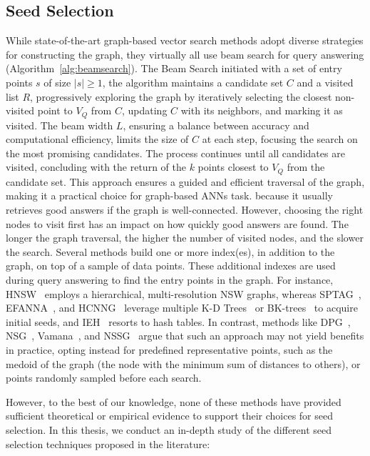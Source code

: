 \subsection{Seed Selection}
\label{sec:ss}
While state-of-the-art graph-based vector search methods adopt diverse strategies for constructing the graph, they virtually all use beam search for query answering (Algorithm~\ref{alg:beamsearch}).
The Beam Search initiated with a set of entry points \( s \) of size $ |s| \geq 1$, the algorithm maintains a candidate set \( C \) and a visited list \( R \), progressively exploring the graph by iteratively selecting the closest non-visited point to \( V_Q \) from \( C \), updating \( C \) with its neighbors, and marking it as visited. The beam width \( L \), ensuring a balance between accuracy and computational efficiency, limits the size of \( C \) at each step, focusing the search on the most promising candidates. The process continues until all candidates are visited, concluding with the return of the \( k \) points closest to \( V_Q \) from the candidate set. This approach ensures a guided and efficient traversal of the graph, making it a practical choice for graph-based ANNs task.
because it usually retrieves good answers if the graph is well-connected. However, choosing the right nodes to visit first has an impact on how quickly good answers are found. The longer the graph traversal, the higher the number of visited nodes, and the slower the search.
Several methods build one or more index(es), in addition to the graph, on top of a sample of data points. These additional indexes are used during query answering to find the entry points in the graph.
For instance, HNSW~\cite{hnsw} employs a hierarchical, multi-resolution NSW graphs, whereas SPTAG~\cite{SPTAG4}, EFANNA~\cite{efanna}, and HCNNG~\cite{hcnng} leverage multiple K-D Trees~\cite{kdtree} or BK-trees~\cite{bkmtree} to acquire initial seeds, and IEH~\cite{ieh} resorts to hash tables. In contrast, methods like DPG~\cite{dpg}, NSG~\cite{nsg}, Vamana~\cite{vamana}, and NSSG~\cite{nssg} argue that such an approach may not yield benefits in practice, opting instead for predefined representative points, such as the medoid of the graph (the node with the minimum sum of distances to others), or points randomly sampled before each search.

However, to the best of our knowledge, none of these methods have provided sufficient theoretical or empirical evidence to support their choices for seed selection. In this thesis, we conduct an in-depth study of the different seed selection techniques proposed in the literature:

